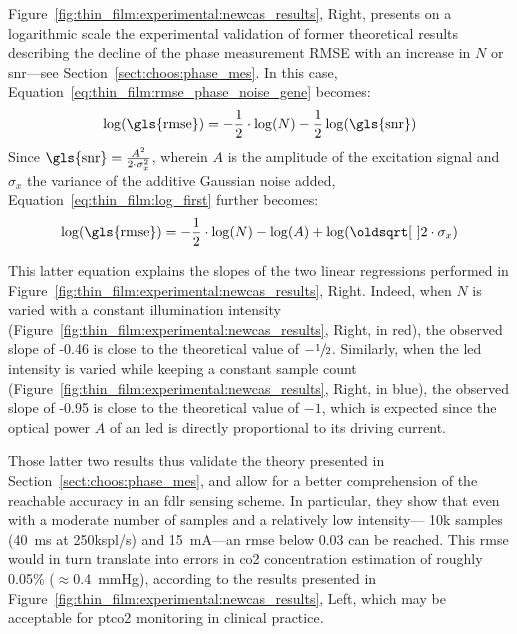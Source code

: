 Figure~\ref{fig:thin_film:experimental:newcas_results}, Right, presents on a logarithmic scale the experimental validation of former theoretical results describing the decline of the phase measurement RMSE with an increase in $N$ or \gls{snr}---see Section~\ref{sect:choos:phase_mes}. In this case, Equation~\ref{eq:thin_film:rmse_phase_noise_gene} becomes:
\begin{equation}\label{eq:thin_film:log_first}
	\log(\text{\gls{rmse}}) = -\frac{1}{2}\cdot \log(N) - \frac{1}{2}\log(\text{\gls{snr}})
\end{equation}
Since $\text{\gls{snr}} = \frac{A^2}{2\cdot \sigma_x^2}$, wherein $A$ is the amplitude of the excitation signal and $\sigma_x$ the variance of the additive Gaussian noise added, Equation~\ref{eq:thin_film:log_first} further becomes:
\begin{equation}\label{eq:thin_film:compact_rmse_A}
	\log(\text{\gls{rmse}}) = -\frac{1}{2}\cdot \log(N) - \log(A) + \log(\sqrt{2}\cdot \sigma_x)
\end{equation}

This latter equation explains the slopes of the two linear regressions performed in Figure~\ref{fig:thin_film:experimental:newcas_results}, Right. Indeed, when $N$ is varied with a constant illumination intensity (Figure~\ref{fig:thin_film:experimental:newcas_results}, Right, in red), the observed slope of -0.46 is close to the theoretical value of $-\sfrac{1}{2}$. Similarly, when the \gls{led} intensity is varied while keeping a constant sample count (Figure~\ref{fig:thin_film:experimental:newcas_results}, Right, in blue), the observed slope of -0.95 is close to the theoretical value of $-1$, which is expected since the optical power $A$ of an \gls{led} is directly proportional to its driving current.

Those latter two results thus validate the theory presented in Section~\ref{sect:choos:phase_mes}, and allow for a better comprehension of the reachable accuracy in an \gls{fdlr} sensing scheme. In particular, they show that even with a moderate number of samples and a relatively low intensity---\ie{} 10k samples (40~ms at 250kspl/s) and 15~mA---an \gls{rmse} below 0.03{\degree} can be reached. This \gls{rmse} would in turn translate into errors in \gls{co2} concentration estimation of roughly 0.05\% ($\approx$0.4~mmHg), according to the results presented in Figure~\ref{fig:thin_film:experimental:newcas_results}, Left, which may be acceptable for \gls{ptco2} monitoring in clinical practice\cite{conway2018}.

